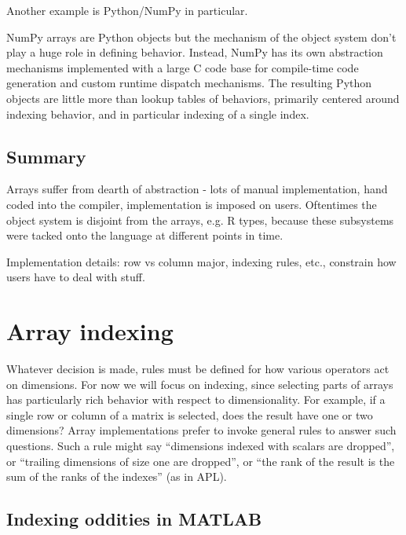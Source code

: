 \documentclass[preprint]{sigplanconf}
\begin{document}
\begin{enumerate}
Another example is Python/NumPy in particular.

NumPy arrays are Python objects but the mechanism of the object system don't
play a huge role in defining behavior. Instead, NumPy has its own abstraction
mechanisms implemented with a large C code base for compile-time code
generation and custom runtime dispatch mechanisms. The resulting Python
objects are little more than lookup tables of behaviors, primarily centered
around indexing behavior, and in particular indexing of a single index.


\end{enumerate}

\subsection{Summary}

Arrays suffer from dearth of abstraction - lots of manual implementation, hand
coded into the compiler, implementation is imposed on users. Oftentimes the
object system is disjoint from the arrays, e.g. R types, because these
subsystems were tacked onto the language at different points in time.

Implementation details: row vs column major, indexing rules, etc., constrain
how users have to deal with stuff.

\section{Array indexing}

Whatever decision is made, rules must be defined for how various operators act
on dimensions. For now we will focus on indexing, since selecting parts of
arrays has particularly rich behavior with respect to dimensionality. For
example, if a single row or column of a matrix is selected, does the result
have one or two dimensions? Array implementations prefer to invoke general
rules to answer such questions. Such a rule might say ``dimensions indexed
with scalars are dropped'', or ``trailing dimensions of size one are
dropped'', or ``the rank of the result is the sum of the ranks of the
indexes'' (as in APL).


\subsection{Indexing oddities in MATLAB}
\end{document}

